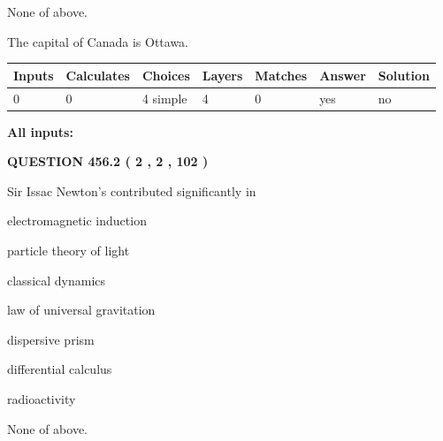 \documentclass[12pt]{article}
\begin{document}
 
 None of above.
 
 
\noindent{}
 
 
The capital of Canada is Ottawa.
 
 
\noindent{}
 
 
   
   
   
   
\noindent\begin{tabular}{|l|l|l|l|l|l|l|}
 \hline
Inputs & Calculates & Choices & Layers & Matches & Answer & Solution \\ \hline
 0  & 
 0  & 
 4
  simple  
  & 
 4  & 
 0  & 
  yes & 
  no 
  \\ \hline
 \end{tabular}
   
   
   
   
\noindent{}
   
   
   
   
\noindent\vspace{0.1in}\hspace{-0.08in} {\textbf{\Large{All inputs: }}}
   
   
  
\vspace{0.2in}
  
{\textbf{\Large{QUESTION
456.2 
 ( 2 , 2 , 102 )
}}}
  
  
Sir Issac Newton's contributed significantly in
 
 
electromagnetic induction
 
 
particle theory of light
 
 
classical dynamics
 
 
law of universal gravitation
 
 
dispersive prism
 
 
differential calculus
 
 
radioactivity
 
 
 None of above.
 
\end{document}
